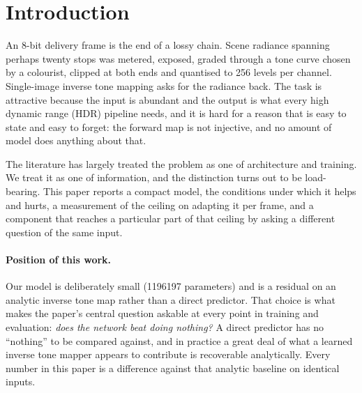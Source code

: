 \section{Introduction}
\label{sec:introduction}

An 8-bit delivery frame is the end of a lossy chain. Scene radiance spanning
perhaps twenty stops was metered, exposed, graded through a tone curve chosen by
a colourist, clipped at both ends and quantised to 256 levels per channel.
Single-image inverse tone mapping asks for the radiance back. The task is
attractive because the input is abundant and the output is what every high
dynamic range (HDR) pipeline needs, and it is hard for a reason that is easy to
state and easy to forget: the forward map is not injective, and no amount of
model does anything about that.

The literature has largely treated the problem as one of architecture and
training. We treat it as one of information, and the distinction turns out to be
load-bearing. This paper reports a compact model, the conditions under which it
helps and hurts, a measurement of the ceiling on adapting it per frame, and a
component that reaches a particular part of that ceiling by asking a different
question of the same input.

\paragraph{Position of this work.}
Our model is deliberately small (\num{1196197} parameters) and is a residual on
an analytic inverse tone map rather than a direct predictor. That choice is what
makes the paper's central question askable at every point in training and
evaluation: \emph{does the network beat doing nothing?} A direct predictor has
no ``nothing'' to be compared against, and in practice a great deal of what a
learned inverse tone mapper appears to contribute is recoverable analytically.
Every number in this paper is a difference against that analytic baseline on
identical inputs.

